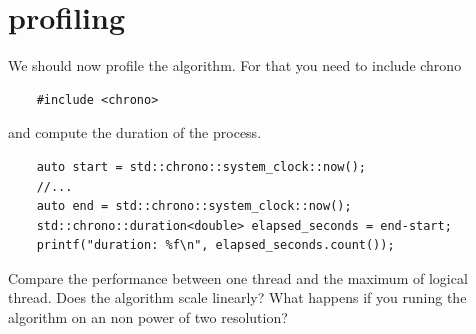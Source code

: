 \documentclass{article}
\begin{document}
\section{profiling}
We should now profile the algorithm. For that you need to include chrono
\begin{lstlisting}
	#include <chrono>
\end{lstlisting}
and compute the duration of the process.
\begin{lstlisting}
	auto start = std::chrono::system_clock::now();
	//...
	auto end = std::chrono::system_clock::now();
	std::chrono::duration<double> elapsed_seconds = end-start;
	printf("duration: %f\n", elapsed_seconds.count());
\end{lstlisting}
Compare the performance between one thread and the maximum of logical thread. Does the algorithm scale linearly? What happens if you runing the algorithm on an non power of two resolution?
\end{document}
